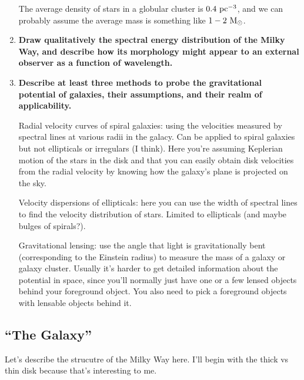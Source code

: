 \begin{enumerate}
      The average density of stars in a globular cluster is $0.4~{\rm pc}^{-3}$, and we can probably assume the average mass is something like $1-2~{\rm M}_\odot$.
\item \textbf{Draw qualitatively the spectral energy distribution of the Milky Way, and describe
      how its morphology might appear to an external observer as a function of wavelength.}
\item \textbf{Describe at least three methods to probe the gravitational potential of galaxies,
      their assumptions, and their realm of applicability.}
      
      Radial velocity curves of spiral galaxies: using the velocities measured by spectral lines at various radii in the galacy. Can be applied to spiral galaxies but not ellipticals or irregulars (I think). Here you're assuming Keplerian motion of the stars in the disk and that you can easily obtain disk velocities from the radial velocity by knowing how the galaxy's plane is projected on the sky.
      
      Velocity dispersions of ellipticals: here you can use the width of spectral lines to find the velocity distribution of stars. Limited to ellipticals (and maybe bulges of spirals?).
      
      Gravitational lensing: use the angle that light is gravitationally bent (corresponding to the Einstein radius) to measure the mass of a galaxy or galaxy cluster. Usually it's harder to get detailed information about the potential in space, since you'll normally just have one or a few lensed objects behind your foreground object. You also need to pick a foreground objects with lensable objects behind it.
      
\end{enumerate}

\subsection{``The Galaxy''}

Let's describe the strucutre of the Milky Way here.  I'll begin with the thick vs thin disk
because that's interesting to me.

